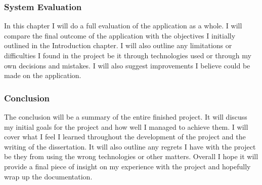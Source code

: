     \subsubsection{System Evaluation}
    In this chapter I will do a full evaluation of the application as a whole. I will compare the final outcome of the application with the objectives I initially outlined in the Introduction chapter. I will also outline any limitations or difficulties I found in the project be it through technologies used or through my own decisions and mistakes. I will also suggest improvements I believe could be made on the application.
    
    \subsubsection{Conclusion}
    The conclusion will be a summary of the entire finished project. It will discuss my initial goals for the project and how well I managed to achieve them. I will cover what I feel I learned throughout the development of the project and the writing of the dissertation. It will also outline any regrets I have with the project be they from using the wrong technologies or other matters. Overall I hope it will provide a final piece of insight on my experience with the project and hopefully wrap up the documentation.
